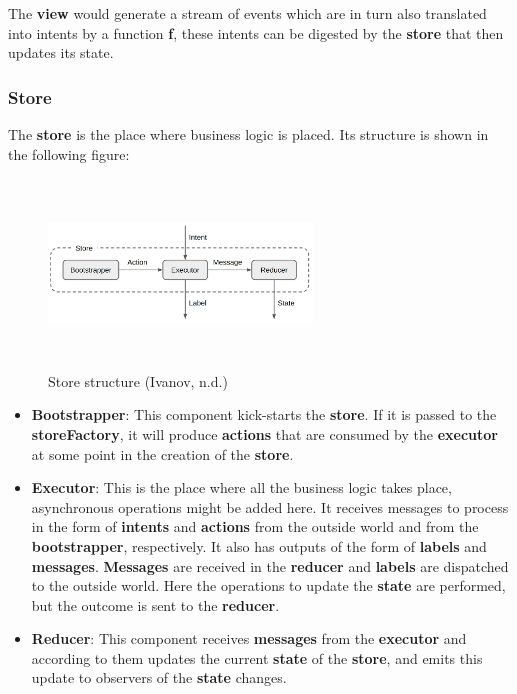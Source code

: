 The \textbf{view} would generate a stream of events which are in turn also translated into intents by a function \textbf{f}, these intents can be digested by the \textbf{store} that then updates its state.

\subsubsection{Store}
The \textbf{store} is the place where business logic is placed. Its structure is shown in the following figure:

\begin{figure}[h]
\centering
\includegraphics[height=5cm,width=7cm]{figures/storeStructure}
\caption{Store structure (Ivanov, n.d.)}
\label{fig: Store structure}
\end{figure}

\begin{itemize}
   \item \textbf{Bootstrapper}: This component kick-starts the \textbf{store}. If it is passed to the \textbf{storeFactory}, it will produce \textbf{actions} that are consumed by the \textbf{executor} at some point in the creation of the \textbf{store}.
  	\item \textbf{Executor}: This is the place where all the business logic takes place, asynchronous operations might be added here. It receives messages to process in the form of \textbf{intents} and \textbf{actions} from the outside world and from the \textbf{bootstrapper}, respectively. It also has outputs of the form of \textbf{labels} and \textbf{messages}. \textbf{Messages} are received in the \textbf{reducer} and \textbf{labels} are dispatched to the outside world. Here the operations to update the \textbf{state} are performed, but the outcome is sent to the \textbf{reducer}.
  	\item \textbf{Reducer}: This component receives \textbf{messages} from the \textbf{executor} and according to them updates the current \textbf{state} of the \textbf{store}, and emits this update to observers of the \textbf{state} changes.
\end{itemize}

